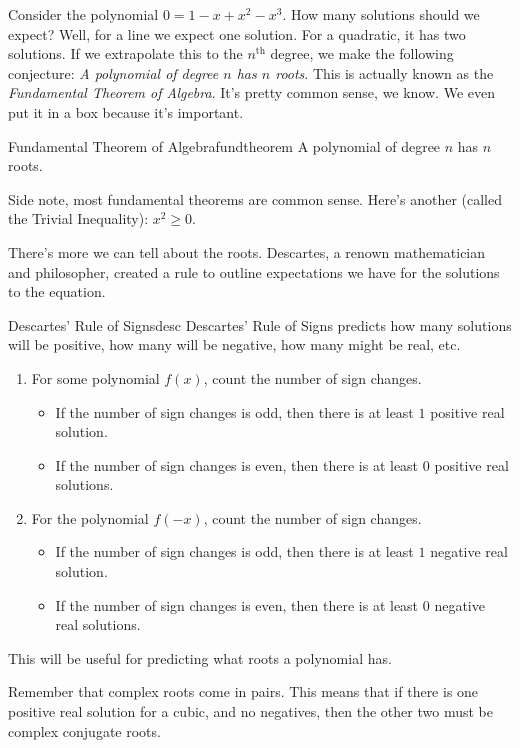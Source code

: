 \documentclass[../book.tex]{subfiles}
\begin{document}
Consider the polynomial $0=1-x+x^2-x^3$. How many solutions should we expect? Well, for a line we expect one solution.  For a quadratic, it has two solutions.  If we extrapolate this to the $n^{\text{th}}$ degree, we make the following conjecture: \textit{A polynomial of degree $n$ has $n$ roots}.  This is actually known as the \textit{Fundamental Theorem of Algebra}. It's pretty common sense, we know. We even put it in a box because it's important.
\begin{theorem}{Fundamental Theorem of Algebra}{fundtheorem}
A polynomial of degree $n$ has $n$ roots.
\end{theorem}

\begin{remark}
Side note, most fundamental theorems are common sense.  Here's another (called the Trivial Inequality): $x^2\geq 0$.
\end{remark}

There's more we can tell about the roots.  Descartes, a renown mathematician and philosopher, created a rule to outline expectations we have for the solutions to the equation.  
\begin{theorem}{Descartes' Rule of Signs}{desc}
Descartes' Rule of Signs predicts how many solutions will be positive, how many will be negative, how many might be real, etc.
\begin{enumerate}
    \item For some polynomial $f(x)$, count the number of sign changes. \begin{itemize}
        \item If the number of sign changes is odd, then there is at least $1$ positive real solution.
        \item If the number of sign changes is even, then there is at least $0$ positive real solutions.
        \end{itemize}
    \item For the polynomial $f(-x)$, count the number of sign changes. \begin{itemize}
        \item If the number of sign changes is odd, then there is at least $1$ negative real solution.
        \item If the number of sign changes is even, then there is at least $0$ negative real solutions.
    \end{itemize}
\end{enumerate}
This will be useful for predicting what roots a polynomial has.
\end{theorem}
\begin{remark}
Remember that complex roots come in pairs.  This means that if there is one positive real solution for a cubic, and no negatives, then the other two must be complex conjugate roots.
\end{remark}
\end{document}
